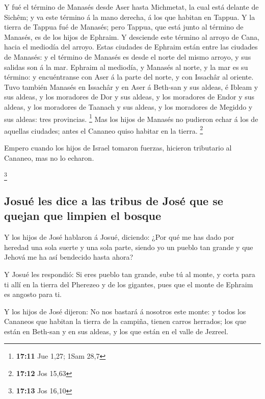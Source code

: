  Y fué el término de Manasés desde Aser hasta Michmetat,
la cual está delante de Sichêm; y va este término á la mano derecha, á
los que habitan en Tappua.  Y la tierra de Tappua fué de
Manasés; pero Tappua, que está junto al término de Manasés, es de los
hijos de Ephraim.  Y desciende este término al arroyo de
Cana, hacia el mediodía del arroyo. Estas ciudades de Ephraim están
entre las ciudades de Manasés: y el término de Manasés es desde el norte
del mismo arroyo, y sus salidas son á la mar.  Ephraim al
mediodía, y Manasés al norte, y la mar es su término: y encuéntranse con
Aser á la parte del norte, y con Issachâr al oriente. 
Tuvo también Manasés en Issachâr y en Aser á Beth-san y sus aldeas, é
Ibleam y sus aldeas, y los moradores de Dor y sus aldeas, y los
moradores de Endor y sus aldeas, y los moradores de Taanach y sus
aldeas, y los moradores de Megiddo y sus aldeas: tres provincias.
\footnote{\textbf{17:11} Jue 1,27; 1Sam 28,7}  Mas los
hijos de Manasés no pudieron echar á los de aquellas ciudades; antes el
Cananeo quiso habitar en la tierra. \footnote{\textbf{17:12} Jos 15,63}

 Empero cuando los hijos de Israel tomaron fuerzas,
hicieron tributario al Cananeo, mas no lo echaron.

\footnote{\textbf{17:13} Jos 16,10}

\hypertarget{josuuxe9-les-dice-a-las-tribus-de-josuxe9-que-se-quejan-que-limpien-el-bosque}{%
\subsection{Josué les dice a las tribus de José que se quejan que
limpien el
bosque}\label{josuuxe9-les-dice-a-las-tribus-de-josuxe9-que-se-quejan-que-limpien-el-bosque}}

 Y los hijos de José hablaron á Josué, diciendo: ¿Por qué
me has dado por heredad una sola suerte y una sola parte, siendo yo un
pueblo tan grande y que Jehová me ha así bendecido hasta ahora?

 Y Josué les respondió: Si eres pueblo tan grande, sube
tú al monte, y corta para ti allí en la tierra del Pherezeo y de los
gigantes, pues que el monte de Ephraim es angosto para ti.

 Y los hijos de José dijeron: No nos bastará á nosotros
este monte: y todos los Cananeos que habitan la tierra de la campiña,
tienen carros herrados; los que están en Beth-san y en sus aldeas, y los
que están en el valle de Jezreel.

